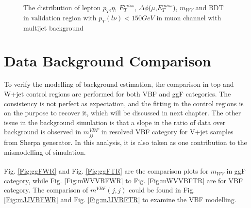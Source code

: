 \begin{figure}[ht]
	\caption{The distribution of lepton $p_{T}$,$\eta$, $E_{T}^{miss}$, $\Delta\phi$($\mu$,$E_{T}^{miss}$), $m_{WV}$ and BDT in validation region with $p_{T}(l\nu)<150 GeV$ in muon channel with multijet background}
	\label{fig:FakeVR2_mu}
\end{figure}
\clearpage
\section{Data Background Comparison}
\label{Sec:data_bkg_compar}
To verify the modelling of background estimation, the comparison in top and W+jet control regions are performed for both VBF and ggF categories. The consistency is not perfect as expectation, and the fitting in the control regions is on the purpose to recover it, which will be discussed in next chapter. The other issue in the background simulation is that a slope in the ratio of data over background is observed in $m^{VBF}_{jj}$ in resolved VBF category for V+jet samples from Sherpa generator. In this analysis, it is also taken as one contribution to the mismodelling of simulation. 
\\
\\Fig. \ref{Fig:ggFWR} and Fig. \ref{Fig:ggFTR} are the comparison plots for $m_{WV}$ in ggF category, while Fig. \ref{Fig:mWVVBFWR} to Fig. \ref{Fig:mWVVBFTR} are for VBF category. The comparison of  $m^{VBF}(j,j)$ could be found in Fig. \ref{Fig:mJJVBFWR} and Fig. \ref{Fig:mJJVBFTR} to examine the VBF modelling. 
\newpage

